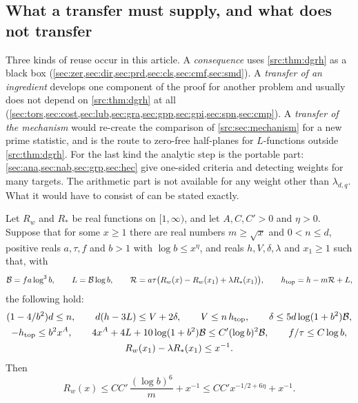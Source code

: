 \subsection{What a transfer must supply, and what does not transfer}\label{src:sec:limits}
\begingroup\raggedright
{}
\endgroup

Three kinds of reuse occur in this article. A \emph{consequence} uses \cref{src:thm:dgrh} as a
black box (\cref{sec:zer,sec:dir,sec:prd,sec:cls,sec:cmf,sec:smd}). A \emph{transfer of an
ingredient} develops one component of the proof for another problem and usually does not depend
on \cref{src:thm:dgrh} at all
(\cref{sec:tors,sec:cost,sec:lub,sec:gra,sec:gpp,sec:gpi,sec:spn,sec:cmp}).
A \emph{transfer of the mechanism} would re-create the comparison of
\cref{src:sec:mechanism} for a new prime statistic, and is the route to zero-free half-planes
for $L$-functions outside \cref{src:thm:dgrh}. For the last kind the analytic step is the
portable part: \cref{sec:ana,sec:nab,sec:grp,sec:hec} give one-sided criteria and detecting
weights for many targets. The arithmetic part is not available for any weight other than
$\lambda_{d,q}$. What it would have to consist of can be stated exactly.

\begin{proposition}\label{src:prop:package}
Let $R_w$ and $R_*$ be real functions on $[1,\infty)$, and let $A,C,C'>0$ and $\eta>0$.
Suppose that for some $x\ge1$ there are real numbers $m\ge\sqrt x$ and $0<n\le d$, positive
reals $a,\tau,f$ and $b>1$ with $\log b\le x^{\eta}$, and reals $h,V,\delta,\lambda$ and
$x_1\ge1$ such that, with
\[
\mathcal{B}=fa\log^3b,\qquad L=\mathcal{B}\log b,\qquad
\mathcal{R}=a\tau\bigl(R_w(x)-R_w(x_1)+\lambda R_*(x_1)\bigr),\qquad h_{\mathrm{top}}=h-m\mathcal{R}+L,
\]
the following hold:
\begin{gather*}
(1-4/b^2)d\le n,\qquad d(h-3L)\le V+2\delta,\qquad V\le n\,h_{\mathrm{top}},\qquad
\delta\le5d\log(1+b^2)\mathcal{B},\\
-h_{\mathrm{top}}\le b^2x^{A},\qquad 4x^{A}+4L+10\log(1+b^2)\mathcal{B}\le C'(\log b)^2\mathcal{B},\qquad
f/\tau\le C\log b,\\
R_w(x_1)-\lambda R_*(x_1)\le x^{-1}.
\end{gather*}
Then
\[
R_w(x)\le CC'\,\frac{(\log b)^6}{m}+x^{-1}\le CC'x^{-1/2+6\eta}+x^{-1} .
\]
\end{proposition}

